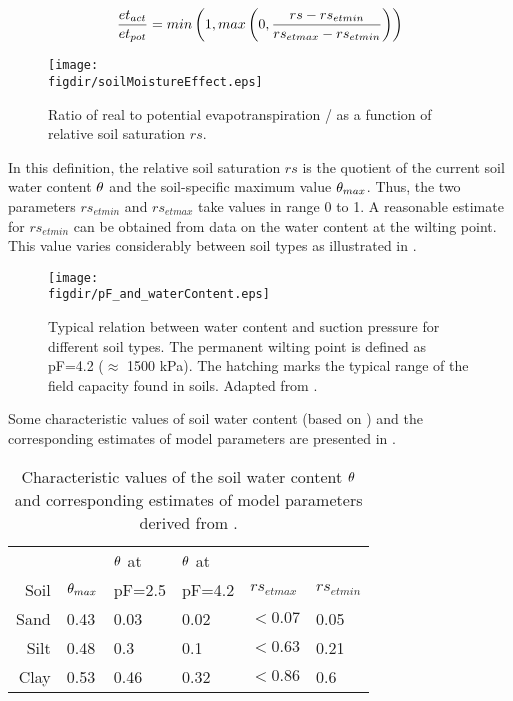 \begin{equation} \label{eqn:eta:soilmoisture}
  \frac{et_{act}}{et_{pot}} = min\left(1, max\left(0, \frac{rs-rs_{et min}}{rs_{et max}-rs_{et min}} \right)\right)
\end{equation}

\begin{figure}
  \centering
  \texttt{[image: \\figdir/soilMoistureEffect.eps]}
  \caption{Ratio of real to potential evapotranspiration \etReal/\etPot{} as a function of relative soil saturation $rs$. \label{fig:eta:soilmoisture}}
\end{figure}

In this definition, the relative soil saturation $rs$ is the quotient of the current soil water content $\theta$ and the soil-specific maximum value $\theta_{max}$. Thus, the two parameters $rs_{et min}$ and $rs_{et max}$ take values in range 0 to 1. A reasonable estimate for $rs_{et min}$ can be obtained from data on the water content at the wilting point. This value varies considerably between soil types as illustrated in .

\begin{figure}
  \centering
  \texttt{[image: \\figdir/pF\_and\_waterContent.eps]}
  \caption{Typical relation between water content and suction pressure for different soil types. The permanent wilting point is defined as pF=4.2 ($\approx$ 1500 kPa). The hatching marks the typical range of the field capacity found in soils. Adapted from \citet{Scheffer1998}. \label{fig:eta:pFCurve}}
\end{figure}

Some characteristic values of soil water content (based on ) and the corresponding estimates of model parameters are presented in .

\begin{table}
  \caption{Characteristic values of the soil water content $\theta$ and corresponding estimates of model parameters derived from . \label{tab:eta:soilmoisture}}
  {\small
  \begin{tabular}{|rlllll|} \hline
    \rowcolor[gray]{0.9}
         &                        & $\theta$ at & $\theta$ at & & \\
    \rowcolor[gray]{0.9}
    Soil & $\theta_{max}$ & pF=2.5 & pF=4.2 & $rs_{et max}$ & $rs_{et min}$ \\ \hline
    Sand & 0.43 & 0.03 & 0.02 & $< 0.07$ & 0.05 \\
    Silt & 0.48 & 0.3  & 0.1  & $< 0.63$ & 0.21 \\
    Clay & 0.53 & 0.46 & 0.32 & $< 0.86$ & 0.6 \\
  \hline
  \end{tabular} 
  }
\end{table}

